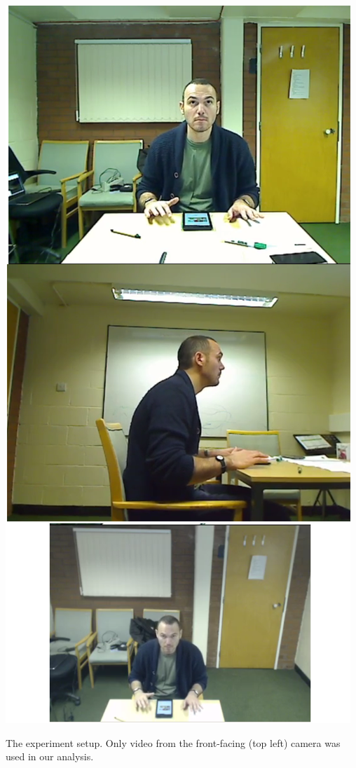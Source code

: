 \documentclass{sigchi-ext}
\begin{document}
\begin{marginfigure}%
  \begin{minipage}{\marginparwidth}
    \centering
    \includegraphics[width=0.9\marginparwidth]{figures/ExperimentSetup}
	  \caption{The experiment setup.  Only video from the front-facing (top left) camera was used in our analysis.\label{fig:setup}}
  \end{minipage}
\end{marginfigure}
\end{document}
